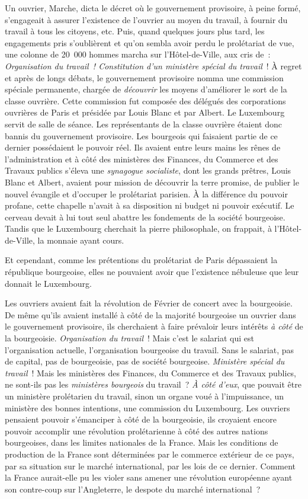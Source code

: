 \documentclass[french,twoside]{book} %
\begin{document}
Un ouvrier, Marche, dicta le décret où le gouvernement provisoire, à peine formé, s’engageait à assurer l’existence de l’ouvrier au moyen du travail, à fournir du travail à tous les citoyens, etc. Puis, quand quelques jours plus tard, les engagements pris s’oublièrent et qu’on sembla avoir perdu le prolétariat de vue, une colonne de 20 000 hommes marcha sur l’Hôtel-de-Ville, aux cris de : \emph{Organisation du travail ! Constitution d’un ministère spécial du travail} ! À regret et après de longs débats, le gouvernement provisoire nomma une commission spéciale permanente, chargée de \emph{découvrir} les moyens d’améliorer le sort de la classe ouvrière. Cette commission fut composée des délégués des corporations ouvrières de Paris et présidée par Louis Blanc et par Albert. Le Luxembourg servit de salle de séance. Les représentants de la classe ouvrière étaient donc bannis du gouvernement provisoire. Les bourgeois qui faisaient partie de ce dernier possédaient le pouvoir réel. Ils avaient entre leurs mains les rênes de l’administration et à côté des ministères des Finances, du Commerce et des Travaux publics s’éleva une \emph{synagogue socialiste}, dont les grands prêtres, Louis Blanc et Albert, avaient pour mission de découvrir la terre promise, de publier le nouvel évangile et d’occuper le prolétariat parisien. À la différence du pouvoir profane, cette chapelle n’avait à sa disposition ni budget ni pouvoir exécutif. Le cerveau devait à lui tout seul abattre les fondements de la société bourgeoise. Tandis que le Luxembourg cherchait la pierre philosophale, on frappait, à l’Hôtel-de-Ville, la monnaie ayant cours.\par
Et cependant, comme les prétentions du prolétariat de Paris dépassaient la république bourgeoise, elles ne pouvaient avoir que l’existence nébuleuse que leur donnait le Luxembourg.\par
Les ouvriers avaient fait la révolution de Février de concert avec la bourgeoisie. De même qu’ils avaient installé à côté de la majorité bourgeoise un ouvrier dans le gouvernement provisoire, ils cherchaient à faire prévaloir leurs intérêts \emph{à côté} de la bourgeoisie. \emph{Organisation du travail} ! Mais c’est le salariat qui est l’organisation actuelle, l’organisation bourgeoise du travail. Sans le salariat, pas de capital, pas de bourgeoisie, pas de société bourgeoise. \emph{Ministère spécial du travail} ! Mais les ministères des Finances, du Commerce et des Travaux publics, ne sont-ils pas les \emph{ministères bourgeois} du travail ? \emph{À côté d’eux}, que pouvait être un ministère prolétarien du travail, sinon un organe voué à l’impuissance, un ministère des bonnes intentions, une commission du Luxembourg. Les ouvriers pensaient pouvoir s’émanciper à côté de la bourgeoisie, ils croyaient encore pouvoir accomplir une révolution prolétarienne à côté des autres nations bourgeoises, dans les limites nationales de la France. Mais les conditions de production de la France sont déterminées par le commerce extérieur de ce pays, par sa situation sur le marché international, par les lois de ce dernier. Comment la France aurait-elle pu les violer sans amener une révolution européenne ayant son contre-coup sur l’Angleterre, le despote du marché international ?\par
\end{document}
